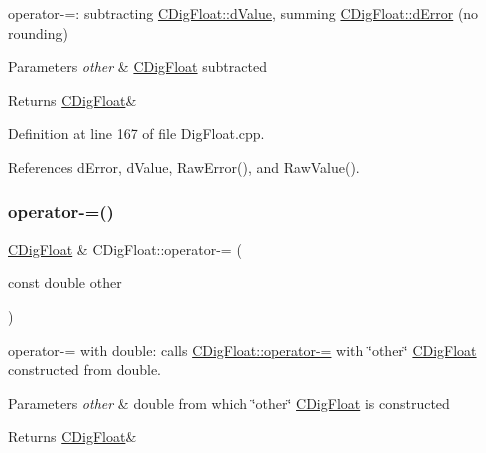 operator-\/=\+: subtracting \hyperlink{classCDigFloat_a4bbe69e30dd4e20527362493aa9aaf96}{C\+Dig\+Float\+::d\+Value}, summing \hyperlink{classCDigFloat_a25eb3782d1e727ff007a48f8308e3d4d}{C\+Dig\+Float\+::d\+Error} (no rounding) 


\begin{DoxyParams}{Parameters}
{\em other} & \hyperlink{classCDigFloat}{C\+Dig\+Float} subtracted \\
\hline
\end{DoxyParams}
\begin{DoxyReturn}{Returns}
\hyperlink{classCDigFloat}{C\+Dig\+Float}\& 
\end{DoxyReturn}


Definition at line 167 of file Dig\+Float.\+cpp.



References d\+Error, d\+Value, Raw\+Error(), and Raw\+Value().

\mbox{\label{classCDigFloat_a783166f772c1d638b03eb62de27d775d}} 
\subsubsection{\texorpdfstring{operator-\/=()}{operator-=()}\hspace{0.1cm}{\footnotesize\ttfamily [2/2]}}
{\footnotesize\ttfamily \hyperlink{classCDigFloat}{C\+Dig\+Float} \& C\+Dig\+Float\+::operator-\/= (\begin{DoxyParamCaption}\item[{const double}]{other }\end{DoxyParamCaption})}



operator-\/= with double\+: calls \hyperlink{classCDigFloat_a7496a4f8445815e9a346076c3d90305a}{C\+Dig\+Float\+::operator-\/=} with \char`\"{}other\char`\"{} \hyperlink{classCDigFloat}{C\+Dig\+Float} constructed from double. 


\begin{DoxyParams}{Parameters}
{\em other} & double from which \char`\"{}other\char`\"{} \hyperlink{classCDigFloat}{C\+Dig\+Float} is constructed \\
\hline
\end{DoxyParams}
\begin{DoxyReturn}{Returns}
\hyperlink{classCDigFloat}{C\+Dig\+Float}\& 
\end{DoxyReturn}


